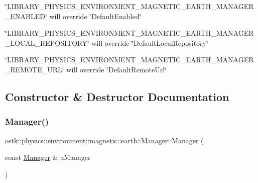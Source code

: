 \begin{DoxyItemize}
\item \char`\"{}\+L\+I\+B\+R\+A\+R\+Y\+\_\+\+P\+H\+Y\+S\+I\+C\+S\+\_\+\+E\+N\+V\+I\+R\+O\+N\+M\+E\+N\+T\+\_\+\+M\+A\+G\+N\+E\+T\+I\+C\+\_\+\+E\+A\+R\+T\+H\+\_\+\+M\+A\+N\+A\+G\+E\+R\+\_\+\+E\+N\+A\+B\+L\+E\+D\char`\"{} will override \char`\"{}\+Default\+Enabled\char`\"{}
\item \char`\"{}\+L\+I\+B\+R\+A\+R\+Y\+\_\+\+P\+H\+Y\+S\+I\+C\+S\+\_\+\+E\+N\+V\+I\+R\+O\+N\+M\+E\+N\+T\+\_\+\+M\+A\+G\+N\+E\+T\+I\+C\+\_\+\+E\+A\+R\+T\+H\+\_\+\+M\+A\+N\+A\+G\+E\+R\+\_\+\+L\+O\+C\+A\+L\+\_\+\+R\+E\+P\+O\+S\+I\+T\+O\+R\+Y\char`\"{} will override \char`\"{}\+Default\+Local\+Repository\char`\"{}
\item \char`\"{}\+L\+I\+B\+R\+A\+R\+Y\+\_\+\+P\+H\+Y\+S\+I\+C\+S\+\_\+\+E\+N\+V\+I\+R\+O\+N\+M\+E\+N\+T\+\_\+\+M\+A\+G\+N\+E\+T\+I\+C\+\_\+\+E\+A\+R\+T\+H\+\_\+\+M\+A\+N\+A\+G\+E\+R\+\_\+\+R\+E\+M\+O\+T\+E\+\_\+\+U\+R\+L\char`\"{} will override \char`\"{}\+Default\+Remote\+Url\char`\"{} 
\end{DoxyItemize}

\subsection{Constructor \& Destructor Documentation}
\mbox{\label{classostk_1_1physics_1_1environment_1_1magnetic_1_1earth_1_1_manager_a92c4248dd976fec3ab048a07a7265f9c}} 
\subsubsection{\texorpdfstring{Manager()}{Manager()}}
{\footnotesize\ttfamily ostk\+::physics\+::environment\+::magnetic\+::earth\+::\+Manager\+::\+Manager (\begin{DoxyParamCaption}\item[{const \hyperlink{classostk_1_1physics_1_1environment_1_1magnetic_1_1earth_1_1_manager}{Manager} \&}]{a\+Manager }\end{DoxyParamCaption})\hspace{0.3cm}{\ttfamily [delete]}}



